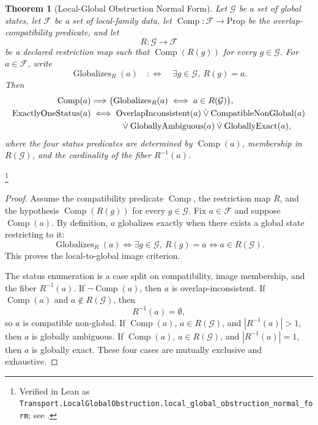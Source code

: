\documentclass[11pt]{article}
\newtheorem{theorem}{Theorem}[section]
\theoremstyle{definition}
\begin{document}
\begin{theorem}[Local-Global Obstruction Normal Form]\label{thm:F4}
Let \(\mathcal G\) be a set of global states, let \(\mathcal F\) be a
set of local-family data, let
\(\operatorname{Comp}:\mathcal F\to\mathrm{Prop}\) be the
overlap-compatibility predicate, and let
\[
  R:\mathcal G\longrightarrow\mathcal F
\]
be a declared restriction map such that
\(\operatorname{Comp}(R(g))\) for every \(g\in\mathcal G\).  For
\(a\in\mathcal F\), write
\[
  \operatorname{Globalizes}_R(a)
  \quad:\Longleftrightarrow\quad
  \exists g\in\mathcal G,\ R(g)=a.
\]
Then
\begin{align*}
  \operatorname{Comp}(a)
  &\Longrightarrow
  \bigl(\operatorname{Globalizes}_R(a)
  \iff a\in R(\mathcal G)\bigr),\\
  \operatorname{ExactlyOneStatus}(a)
  &\iff
  \operatorname{OverlapInconsistent}(a)
  \mathbin{\dot\vee}
  \operatorname{CompatibleNonGlobal}(a)\\
  &\hspace{3.5em}\mathbin{\dot\vee}
  \operatorname{GloballyAmbiguous}(a)
  \mathbin{\dot\vee}
  \operatorname{GloballyExact}(a),
\end{align*}
where the four status predicates are determined by
\(\operatorname{Comp}(a)\), membership in \(R(\mathcal G)\), and the
cardinality of the fiber \(R^{-1}(a)\).
\end{theorem}
\footnote{Verified in Lean as
\texttt{Transport.LocalGlobalObstruction.\allowbreak{}local\_global\_obstruction\_normal\_form};
see .}

\begin{proof}
Assume the compatibility predicate \(\operatorname{Comp}\), the
restriction map \(R\), and the hypothesis
\(\operatorname{Comp}(R(g))\) for every \(g\in\mathcal G\).  Fix
\(a\in\mathcal F\) and suppose \(\operatorname{Comp}(a)\).  By
definition, \(a\) globalizes exactly when there exists a global state
restricting to it:
\[
  \operatorname{Globalizes}_R(a)
  \iff
  \exists g\in\mathcal G,\ R(g)=a
  \iff
  a\in R(\mathcal G).
\]
This proves the local-to-global image criterion.

The status enumeration is a case split on compatibility, image
membership, and the fiber \(R^{-1}(a)\).  If
\(\neg\operatorname{Comp}(a)\), then \(a\) is overlap-inconsistent.
If \(\operatorname{Comp}(a)\) and \(a\notin R(\mathcal G)\), then
\[
  R^{-1}(a)=\emptyset,
\]
so \(a\) is compatible non-global.  If
\(\operatorname{Comp}(a)\), \(a\in R(\mathcal G)\), and
\(|R^{-1}(a)|>1\), then \(a\) is globally ambiguous.  If
\(\operatorname{Comp}(a)\), \(a\in R(\mathcal G)\), and
\(|R^{-1}(a)|=1\), then \(a\) is globally exact.  These four cases
are mutually exclusive and exhaustive.
\end{proof}
\end{document}
